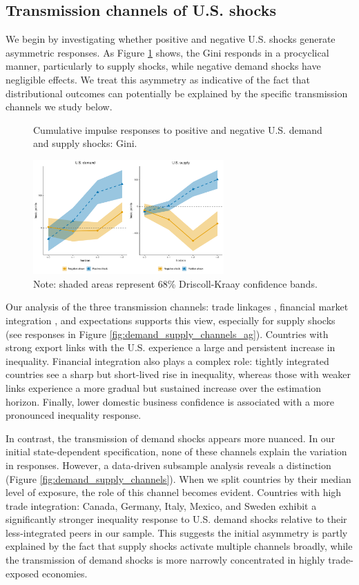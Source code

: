 \documentclass[12pt, a4paper]{article}
\begin{document}
\subsection{Transmission channels of U.S. shocks}
We begin by investigating whether positive and negative U.S. shocks generate asymmetric responses. As Figure \ref{fig:demand_supply_asym} shows, the Gini responds in a procyclical manner, particularly to supply shocks, while negative demand shocks have negligible effects. We treat this asymmetry as indicative of the fact that distributional outcomes can potentially be explained by the specific transmission channels we study below.

\begin{figure}[H]
    \centering
    \caption{Cumulative impulse responses to positive and negative U.S. demand and supply shocks: Gini.}
    \label{fig:demand_supply_asym}
    \includegraphics[width=0.65\textwidth]{Figures/asymmetric_IRFs.pdf}
    \centering \caption*{Note: shaded areas represent 68\% Driscoll-Kraay confidence bands.}
\end{figure}

Our analysis of the three transmission channels: trade linkages \parencite{corsetti2011multilateral}, financial market integration \parencite{faccini2016international}, and expectations \parencite{klein2021real} supports this view, especially for supply shocks (see responses in Figure \ref{fig:demand_supply_channels_ag}). Countries with strong export links with the U.S. experience a large and persistent increase in inequality. Financial integration also plays a complex role: tightly integrated countries see a sharp but short-lived rise in inequality, whereas those with weaker links experience a more gradual but sustained increase over the estimation horizon. Finally, lower domestic business confidence is associated with a more pronounced inequality response.

In contrast, the transmission of demand shocks appears more nuanced. In our initial state-dependent specification, none of these channels explain the variation in responses. However, a data-driven subsample analysis reveals a distinction (Figure \ref{fig:demand_supply_channels}). When we split countries by their median level of exposure, the role of this channel becomes evident. Countries with high trade integration: Canada, Germany, Italy, Mexico, and Sweden exhibit a significantly stronger inequality response to U.S. demand shocks relative to their less-integrated peers in our sample. This suggests the initial asymmetry is partly explained by the fact that supply shocks activate multiple channels broadly, while the transmission of demand shocks is more narrowly concentrated in highly trade-exposed economies.
\end{document}
